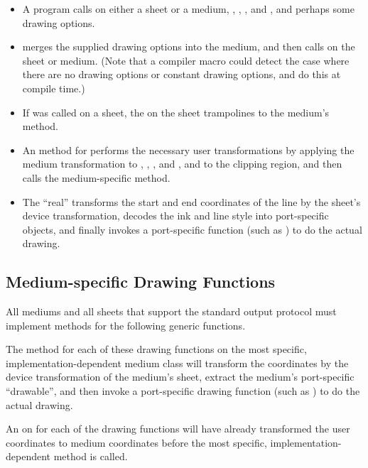 \begin{itemize} 
\item A program calls  on either a sheet or a medium, ,
, , and , and perhaps some drawing options.

\item {} merges the supplied drawing options into the medium, and
then calls  on the sheet or medium.  (Note that a compiler
macro could detect the case where there are no drawing options or constant
drawing options, and do this at compile time.)

\item If  was called on a sheet, the  on
the sheet trampolines to the medium's  method.

\item An  method for  performs the necessary
user transformations by applying the medium transformation to ,
, , and , and to the clipping region, and then calls the
medium-specific method.

\item The ``real''  transforms the start and end
coordinates of the line by the sheet's device transformation, decodes the ink
and line style into port-specific objects, and finally invokes a port-specific
function (such as ) to do the actual drawing.
\end{itemize}


\subsection {Medium-specific Drawing Functions}

All mediums and all sheets that support the standard output protocol must
implement methods for the following generic functions.

The method for each of these drawing functions on the most specific,
implementation-dependent medium class will transform the coordinates by the
device transformation of the medium's sheet, extract the medium's port-specific
``drawable'', and then invoke a port-specific drawing function (such as
) to do the actual drawing.

An  on  for each of the drawing functions will have
already transformed the user coordinates to medium coordinates before the most
specific, implementation-dependent method is called.

